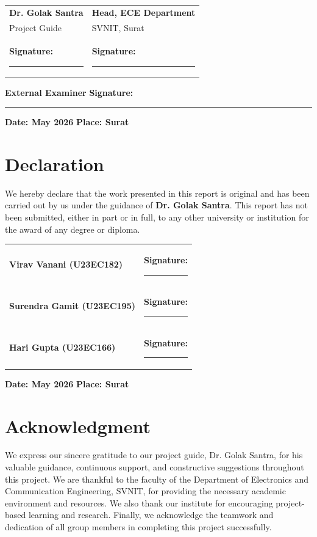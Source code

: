 \documentclass[12pt,a4paper]{report}
\begin{document}
\vspace{2cm}
\noindent
\begin{tabular}{p{} p{}}
\textbf{Dr. Golak Santra} & \textbf{Head, ECE Department} \\
Project Guide & SVNIT, Surat \\
\textbf{Signature:} \rule{5cm}{0.4pt} & \textbf{Signature:} \rule{5cm}{0.4pt} \\
\end{tabular}

\vspace{1.5cm}
\noindent
\textbf{External Examiner} \hfill \textbf{Signature:} \rule{5cm}{0.4pt}

\vspace{0.5cm}
\noindent
\textbf{Date: May 2026} \hfill \textbf{Place: Surat}

\chapter*{Declaration}
We hereby declare that the work presented in this report is original and has been carried out by us under the guidance of \textbf{Dr. Golak Santra}. This report has not been submitted, either in part or in full, to any other university or institution for the award of any degree or diploma.

\vspace{2cm}
\noindent
\begin{tabular}{p{} p{}}
\textbf{Virav Vanani (U23EC182)} & \textbf{Signature:} \rule{4cm}{0.4pt} \\
\textbf{Surendra Gamit (U23EC195)} & \textbf{Signature:} \rule{4cm}{0.4pt} \\
\textbf{Hari Gupta (U23EC166)} & \textbf{Signature:} \rule{4cm}{0.4pt} \\
\end{tabular}

\vspace{1cm}
\noindent
\textbf{Date: May 2026} \hfill \textbf{Place: Surat}

\chapter*{Acknowledgment}
We express our sincere gratitude to our project guide, Dr. Golak Santra, for his valuable guidance, continuous support, and constructive suggestions throughout this project. We are thankful to the faculty of the Department of Electronics and Communication Engineering, SVNIT, for providing the necessary academic environment and resources. We also thank our institute for encouraging project-based learning and research. Finally, we acknowledge the teamwork and dedication of all group members in completing this project successfully.
\end{document}
